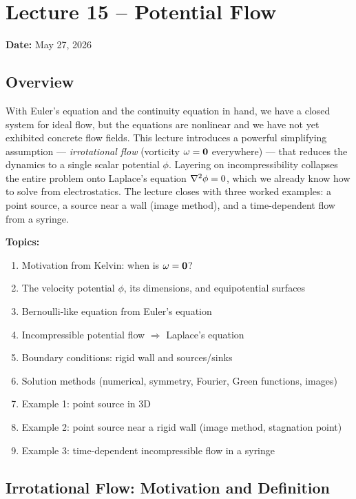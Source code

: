 \documentclass[../main.tex]{subfiles}
\begin{document}
\section{Lecture 15 -- Potential Flow}\label{sec:lec15}
\begin{center}
  \textbf{Date:} May 27, 2026
\end{center}

\subsection*{Overview}
With Euler's equation and the continuity equation in hand, we have a closed system for ideal flow, but the equations are nonlinear and we have not yet exhibited concrete flow fields. This lecture introduces a powerful simplifying assumption — \emph{irrotational flow} (vorticity $\mathbf{\omega}=\mathbf{0}$ everywhere) — that reduces the dynamics to a single scalar potential $\phi$. Layering on incompressibility collapses the entire problem onto Laplace's equation $\nabla^2\phi=0$, which we already know how to solve from electrostatics. The lecture closes with three worked examples: a point source, a source near a wall (image method), and a time-dependent flow from a syringe.

\medskip\noindent\textbf{Topics:}
\begin{enumerate}
  \item Motivation from Kelvin: when is $\mathbf{\omega}=\mathbf{0}$?
  \item The velocity potential $\phi$, its dimensions, and equipotential surfaces
  \item Bernoulli-like equation from Euler's equation
  \item Incompressible potential flow $\Rightarrow$ Laplace's equation
  \item Boundary conditions: rigid wall and sources/sinks
  \item Solution methods (numerical, symmetry, Fourier, Green functions, images)
  \item Example 1: point source in 3D
  \item Example 2: point source near a rigid wall (image method, stagnation point)
  \item Example 3: time-dependent incompressible flow in a syringe
\end{enumerate}

\subsection{Irrotational Flow: Motivation and Definition}\label{sec:lec15:irrot}
\end{document}
